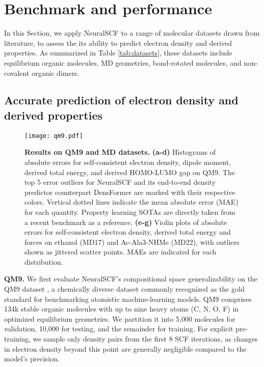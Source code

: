 \documentclass[%
reprint,
superscriptaddress,
bibnotes,
amsmath,amssymb,
aps,
floatfix, %
]{revtex4-2}
\begin{document}
\section{\label{sec:B&M}Benchmark and performance}

In this Section, we apply NeuralSCF to a range of molecular datasets drawn from literature, to assess the its ability to predict electron density and derived properties. As summarized in Table \ref{tab:datasets}, these datasets include equilibrium organic molecules, MD geometries, bond-rotated molecules, and non-covalent organic dimers. 

\subsection{\label{sec:benchmark}Accurate prediction of electron density and derived properties}

\begin{figure*}[ht!]
  \texttt{[image: qm9.pdf]}%
  \caption{\textbf{Results on QM9 and MD datasets.} \textbf{(a-d)} Histograms of absolute errors for self-consistent electron density, dipole moment, derived total energy, and derived HOMO-LUMO gap on QM9. The top 5 error outliers for NeuralSCF and its end-to-end density predictor counterpart DensFormer are marked with their respective colors. Vertical dotted lines indicate the mean absolute error (MAE) for each quantity. Property learning SOTAs are directly taken from a recent benchmark \cite{liao2023equiformerv2} as a reference. \textbf{(e-g)} Violin plots of absolute errors for self-consistent electron density, derived total energy and forces on ethanol (MD17) and Ac-Ala3-NHMe (MD22), with outliers shown as jittered scatter points. MAEs are indicated for each distribution.
  }
  \label{fig:qm9}
\end{figure*}

\noindent\textbf{QM9.} We first evaluate NeuralSCF's compositional space generalizability on the QM9 dataset \cite{ramakrishnan2014quantum}, a chemically diverse dataset commonly recognized as the gold standard for benchmarking atomistic machine-learning models. QM9 comprises 134k stable organic molecules with up to nine heavy atoms (C, N, O, F) in optimized equilibrium geometries. We partition it into 5,000 molecules for validation, 10,000 for testing, and the remainder for training. For explicit pre-training, we sample only density pairs from the first 8 SCF iterations, as changes in electron density beyond this point are generally negligible compared to the model's precision.
\end{document}
